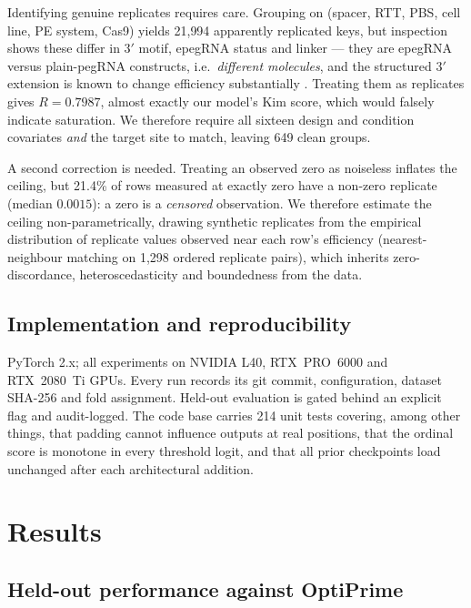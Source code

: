 \documentclass[11pt]{article}
\begin{document}
Identifying genuine replicates requires care. Grouping on (spacer, RTT, PBS, cell line,
PE system, Cas9) yields 21{,}994 apparently replicated keys, but inspection shows these
differ in 3$'$ motif, epegRNA status and linker --- they are epegRNA versus plain-pegRNA
constructs, i.e.\ \emph{different molecules}, and the structured 3$'$ extension is known
to change efficiency substantially \citep{nelson2022}. Treating them as replicates gives
$R=0.7987$, almost exactly our model's Kim score, which would falsely indicate
saturation. We therefore require all sixteen design and condition covariates
\emph{and} the target site to match, leaving 649 clean groups.

A second correction is needed. Treating an observed zero as noiseless inflates the
ceiling, but 21.4\% of rows measured at exactly zero have a non-zero replicate (median
$0.0015$): a zero is a \emph{censored} observation. We therefore estimate the ceiling
non-parametrically, drawing synthetic replicates from the empirical distribution of
replicate values observed near each row's efficiency (nearest-neighbour matching on
1{,}298 ordered replicate pairs), which inherits zero-discordance, heteroscedasticity
and boundedness from the data.

\subsection{Implementation and reproducibility}

PyTorch 2.x; all experiments on NVIDIA L40, RTX~PRO~6000 and RTX~2080~Ti GPUs. Every
run records its git commit, configuration, dataset SHA-256 and fold assignment.
Held-out evaluation is gated behind an explicit flag and audit-logged. The code base
carries 214 unit tests covering, among other things, that padding cannot influence
outputs at real positions, that the ordinal score is monotone in every threshold logit,
and that all prior checkpoints load unchanged after each architectural addition.

\section{Results}

\subsection{Held-out performance against OptiPrime}
\end{document}
